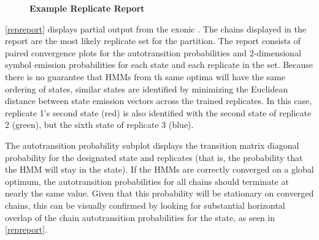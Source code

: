 \documentclass{ut-thesis}
\begin{document}
\begin{NoHyper}
\begin{figure}[!h]
    \caption{{\bf Example \protect{} Replicate Report}}
    \label{repreport}
\end{figure}

\autoref{repreport} displays partial output from the exonic . The chains displayed in the report are the most likely replicate set for the partition. The report consists of paired convergence plots for the autotransition probabilities and 2-dimensional symbol emission probabilities for each state and each replicate in the set. Because there is no guarantee that HMMs from th same optima will have the same ordering of states, similar states are identified by minimizing the Euclidean distance between state emission vectors across the trained replicates. In this case, replicate 1's second state (red) is also identified with the second state of replicate 2 (green), but the sixth state of replicate 3 (blue).

The autotransition probability subplot displays the transition matrix diagonal probability for the designated state and replicates (that is, the probability that the HMM will stay in the state). If the HMMs are correctly converged on a global optimum, the autotransition probabilities for all chains should terminate at nearly the same value. Given that this probability will be stationary on converged chains, this can be visually confirmed by looking for substantial horizontal overlap of the chain autotransition probabilities for the state, as seen in \autoref{repreport}.


\end{NoHyper}
\end{document}
